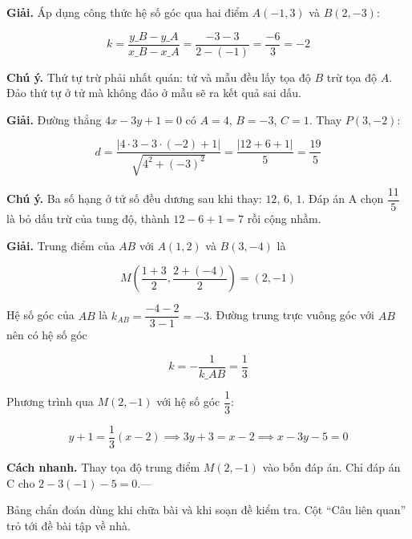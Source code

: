 \documentclass[11pt, a4paper]{article}
\begin{document}
\begin{dapan}[13 — Đáp án B]
\textbf{Giải.} Áp dụng công thức hệ số góc qua hai điểm $A(-1, 3)$ và $B(2, -3)$:

$$k = \frac{y\_B - y\_A}{x\_B - x\_A} = \frac{-3 - 3}{2 - (-1)} = \frac{-6}{3} = -2$$

\textbf{Chú ý.} Thứ tự trừ phải nhất quán: tử và mẫu đều lấy tọa độ $B$ trừ tọa độ $A$. Đảo thứ tự ở tử mà không đảo ở mẫu sẽ ra kết quả sai dấu.
\end{dapan}

\begin{dapan}[14 — Đáp án D]
\textbf{Giải.} Đường thẳng $4x - 3y + 1 = 0$ có $A = 4$, $B = -3$, $C = 1$. Thay $P(3, -2)$:

$$d = \frac{|4 \cdot 3 - 3 \cdot (-2) + 1|}{\sqrt{4^2 + (-3)^2}} = \frac{|12 + 6 + 1|}{5} = \frac{19}{5}$$

\textbf{Chú ý.} Ba số hạng ở tử số đều dương sau khi thay: $12$, $6$, $1$. Đáp án A chọn $\dfrac{11}{5}$ là bỏ dấu trừ của tung độ, thành $12 - 6 + 1 = 7$ rồi cộng nhầm.
\end{dapan}

\begin{dapan}[15 — Đáp án C]
\textbf{Giải.} Trung điểm của $AB$ với $A(1,2)$ và $B(3,-4)$ là

$$M\left(\frac{1+3}{2}, \frac{2+(-4)}{2}\right) = (2, -1)$$

Hệ số góc của $AB$ là $k_{AB} = \dfrac{-4-2}{3-1} = -3$. Đường trung trực vuông góc với $AB$ nên có hệ số góc

$$k = -\frac{1}{k\_{AB}} = \frac{1}{3}$$

Phương trình qua $M(2, -1)$ với hệ số góc $\dfrac{1}{3}$:

$$y + 1 = \frac{1}{3}(x - 2) \implies 3y + 3 = x - 2 \implies x - 3y - 5 = 0$$

\textbf{Cách nhanh.} Thay tọa độ trung điểm $M(2,-1)$ vào bốn đáp án. Chỉ đáp án C cho $2 - 3(-1) - 5 = 0$.---
\end{dapan}

\clearpage
{}

Bảng chẩn đoán dùng khi chữa bài và khi soạn đề kiểm tra. Cột ``Câu liên quan'' trỏ tới đề bài tập về nhà.
\end{document}
